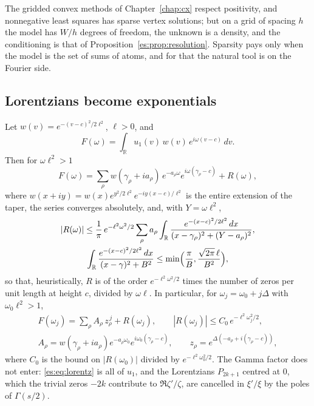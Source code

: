 The gridded convex methods of Chapter~\ref{chap:cx} respect positivity, and nonnegative least squares has sparse vertex solutions; but on a grid of spacing $h$ the model has $W/h$ degrees of freedom, the unknown is a density, and the conditioning is that of Proposition~\ref{es:prop:resolution}. Sparsity pays only when the model is the set of sums of atoms, and for that the natural tool is on the Fourier side.

\subsection{Lorentzians become exponentials}

\begin{theorem}\label{es:thm:taper}
Let $w(v)=e^{-(v-c)^2/2\ell^2}$, $\ell>0$, and
\[
F(\omega)=\int_{\mathbb R}u_1(v)\,w(v)\,e^{i\omega(v-c)}\,dv .
\]
Then for $\omega\ell^2>1$
\begin{equation}\label{es:eq:taperF}
F(\omega)=\sum_\rho w(\gamma_\rho+ia_\rho)\,e^{-a_\rho\omega}e^{i\omega(\gamma_\rho-c)}+R(\omega),
\end{equation}
where $w(x+iy)=w(x)e^{y^2/2\ell^2}e^{-iy(x-c)/\ell^2}$ is the entire extension of the taper, the series converges absolutely, and, with $Y=\omega\ell^2$,
\[
\begin{gathered}|R(\omega)|\le\frac1\pi\,e^{-\ell^2\omega^2/2}\sum_\rho a_\rho\int_{\mathbb R}\frac{e^{-(x-c)^2/2\ell^2}\,dx}{(x-\gamma_\rho)^2+(Y-a_\rho)^2},\\ \int_{\mathbb R}\frac{e^{-(x-c)^2/2\ell^2}\,dx}{(x-\gamma)^2+B^2}\le\min\Bigl(\frac\pi B,\frac{\sqrt{2\pi}\,\ell}{B^2}\Bigr),\end{gathered}
\]
so that, heuristically, $R$ is of the order $e^{-\ell^2\omega^2/2}$ times the number of zeros per unit length at height $c$, divided by $\omega\ell$. In particular, for $\omega_j=\omega_0+j\Delta$ with $\omega_0\ell^2>1$,
\begin{gather*}
F(\omega_j)=\sum_\rho A_\rho\,z_\rho^{\,j}+R(\omega_j),\qquad|R(\omega_j)|\le C_0\,e^{-\ell^2\omega_j^2/2},\\
A_\rho=w(\gamma_\rho+ia_\rho)e^{-a_\rho\omega_0}e^{i\omega_0(\gamma_\rho-c)},\qquad z_\rho=e^{\Delta(-a_\rho+i(\gamma_\rho-c))},
\end{gather*}
where $C_0$ is the bound on $|R(\omega_0)|$ divided by $e^{-\ell^2\omega_0^2/2}$. The Gamma factor does not enter: \eqref{es:eq:lorentz} is all of $u_1$, and the Lorentzians $P_{2k+1}$ centred at $0$, which the trivial zeros $-2k$ contribute to $\Re\zeta'/\zeta$, are cancelled in $\xi'/\xi$ by the poles of $\Gamma(s/2)$.
\end{theorem}

